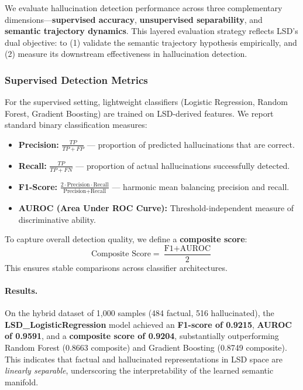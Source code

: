 \documentclass[11pt]{article}
\begin{document}
We evaluate hallucination detection performance across three complementary dimensions—\textbf{supervised accuracy}, \textbf{unsupervised separability}, and \textbf{semantic trajectory dynamics}. This layered evaluation strategy reflects LSD’s dual objective: to (1) validate the semantic trajectory hypothesis empirically, and (2) measure its downstream effectiveness in hallucination detection.

\subsubsection{Supervised Detection Metrics}

For the supervised setting, lightweight classifiers (Logistic Regression, Random Forest, Gradient Boosting) are trained on LSD-derived features. We report standard binary classification measures:

\begin{itemize}[leftmargin=*]
    \item \textbf{Precision:} $\frac{TP}{TP + FP}$ — proportion of predicted hallucinations that are correct.
    \item \textbf{Recall:} $\frac{TP}{TP + FN}$ — proportion of actual hallucinations successfully detected.
    \item \textbf{F1-Score:} $\frac{2 \cdot \text{Precision} \cdot \text{Recall}}{\text{Precision} + \text{Recall}}$ — harmonic mean balancing precision and recall.
    \item \textbf{AUROC (Area Under ROC Curve):} Threshold-independent measure of discriminative ability.
\end{itemize}

To capture overall detection quality, we define a \textbf{composite score}:
\[
\text{Composite Score} = \frac{\text{F1} + \text{AUROC}}{2}
\]
This ensures stable comparisons across classifier architectures.

\paragraph{Results.}  
On the hybrid dataset of 1,000 samples (484 factual, 516 hallucinated), the \textbf{LSD\_LogisticRegression} model achieved an \textbf{F1-score of 0.9215}, \textbf{AUROC of 0.9591}, and a \textbf{composite score of 0.9204}, substantially outperforming Random Forest (0.8663 composite) and Gradient Boosting (0.8749 composite).  
This indicates that factual and hallucinated representations in LSD space are \emph{linearly separable}, underscoring the interpretability of the learned semantic manifold.
\end{document}

